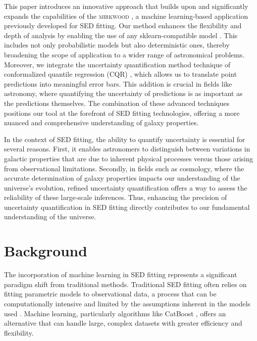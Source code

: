 \documentclass[letterpaper]{article} %
\begin{document}
This paper introduces an innovative approach that builds upon and significantly expands the capabilities of the \textsc{mirkwood} \cite{Gilda21}, a machine learning-based application previously developed for SED fitting. Our method enhances the flexibility and depth of analysis by enabling the use of any sklearn-compatible model \cite{scikit-learn}. This includes not only probabilistic models but also deterministic ones, thereby broadening the scope of application to a wider range of astronomical problems. Moreover, we integrate the uncertainty quantification method technique of conformalized quantile regression (CQR) \cite{cqr}, which allows us to translate point predictions into meaningful error bars. This addition is crucial in fields like astronomy, where quantifying the uncertainty of predictions is as important as the predictions themselves. The combination of these advanced techniques positions our tool at the forefront of SED fitting technologies, offering a more nuanced and comprehensive understanding of galaxy properties.

In the context of SED fitting, the ability to quantify uncertainty is essential for several reasons. First, it enables astronomers to distinguish between variations in galactic properties that are due to inherent physical processes versus those arising from observational limitations. Secondly, in fields such as cosmology, where the accurate determination of galaxy properties impacts our understanding of the universe's evolution, refined uncertainty quantification offers a way to assess the reliability of these large-scale inferences. Thus, enhancing the precision of uncertainty quantification in SED fitting directly contributes to our fundamental understanding of the universe.



\section{Background}
The incorporation of machine learning in SED fitting represents a significant paradigm shift from traditional methods. Traditional SED fitting often relies on fitting parametric models to observational data, a process that can be computationally intensive and limited by the assumptions inherent in the models used \cite{walcher2011fitting, conroy2013modeling}. Machine learning, particularly algorithms like CatBoost \cite{dorogush2018catboost}, offers an alternative that can handle large, complex datasets with greater efficiency and flexibility.
\end{document}
